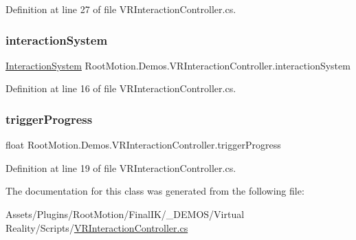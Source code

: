 Definition at line 27 of file V\+R\+Interaction\+Controller.\+cs.

\mbox{\label{class_root_motion_1_1_demos_1_1_v_r_interaction_controller_a8df7c7de3858f7cdccb5641220c09f0b}} 
\subsubsection{\texorpdfstring{interaction\+System}{interactionSystem}}
{\footnotesize\ttfamily \mbox{\hyperlink{class_root_motion_1_1_final_i_k_1_1_interaction_system}{Interaction\+System}} Root\+Motion.\+Demos.\+V\+R\+Interaction\+Controller.\+interaction\+System\hspace{0.3cm}{\ttfamily [get]}}



Definition at line 16 of file V\+R\+Interaction\+Controller.\+cs.

\mbox{\label{class_root_motion_1_1_demos_1_1_v_r_interaction_controller_ab3eedbdbc29f28a3438c1911d7d3ce64}} 
\subsubsection{\texorpdfstring{trigger\+Progress}{triggerProgress}}
{\footnotesize\ttfamily float Root\+Motion.\+Demos.\+V\+R\+Interaction\+Controller.\+trigger\+Progress\hspace{0.3cm}{\ttfamily [get]}}



Definition at line 19 of file V\+R\+Interaction\+Controller.\+cs.



The documentation for this class was generated from the following file\+:\begin{DoxyCompactItemize}
\item 
Assets/\+Plugins/\+Root\+Motion/\+Final\+I\+K/\+\_\+\+D\+E\+M\+O\+S/\+Virtual Reality/\+Scripts/\mbox{\hyperlink{_v_r_interaction_controller_8cs}{V\+R\+Interaction\+Controller.\+cs}}\end{DoxyCompactItemize}
